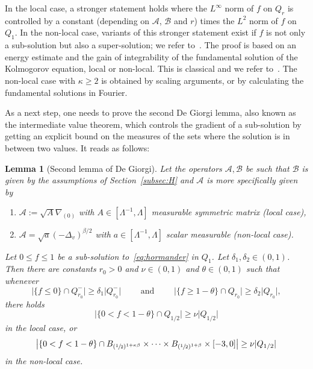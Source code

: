 \documentclass[10pt,a4paper]{amsart}
\newenvironment{enumeratei}
{\bgroup\def\theenumi{\roman{enumi}}\def\theenumii{\arabic{enumii}}\begin{enumerate}}
{\end{enumerate}\egroup}
\newtheorem{lemma}[theorem]{Lemma}
\theoremstyle{definition}
\newcommand{\cA}{{\mathcal A}}
\newcommand{\cB}{{\mathcal B}}
\begin{document}
In the local case, a stronger statement holds where the
$L^\infty$ norm of $f$ on $Q_r$ is controlled by a constant
(depending on $\cA$, $\cB$ and $r$) times the $L^2$ norm of $f$
on $Q_1$. In the non-local case, variants of this stronger
statement exist if $f$ is not only a sub-solution but also a
super-solution; we refer to~\cite{Loher-2023, Loher-2024}. The proof is based
on an energy estimate and the gain of integrability of the
fundamental solution of the Kolmogorov equation, local or
non-local. This is classical and we refer
to~\cite{guerand-mouhot,loher-2022-preprint-quantitative-de-giorgi,AR-harnack, PP, IS-weak, APP}. The
non-local case with $\kappa \geq 2$ is obtained
by scaling arguments, or by calculating the fundamental
solutions in Fourier.

As a next step, one needs to prove the second De Giorgi lemma, also known as the intermediate value theorem, which controls the gradient of a sub-solution by getting an explicit bound on the measures of the sets where the solution is in between two values.
It reads as follows:
\begin{lemma}[Second lemma of De Giorgi]
Let the operators $\cA, \cB$ be such that $\cB$ is given by
the assumptions of Section~\ref{subsec:H} and $\cA$ is more specifically given by
\begin{enumeratei}
\item
$\cA:=\sqrt{A} \nabla_{(0)}$ with
$A \in [\Lambda^{-1},\Lambda]$ measurable symmetric matrix (local
case),
\item
$\cA = \sqrt{a} (-\Delta_v)^{\beta/2}$ with
$a \in [\Lambda^{-1},\Lambda]$ scalar measurable (non-local
case).
\end{enumeratei}
Let $0 \leq f \leq 1$ be a sub-solution to~\eqref{eq:hormander} in $Q_1$. Let $\delta_1, \delta_2 \in (0, 1)$. Then there are
constants $r_0 > 0$ and $\nu \in (0, 1)$ and
$\theta \in (0, 1)$ such that whenever
\begin{equation*}
\label{eq:conditions-ivl}
\vert \{f \leq 0\} \cap Q_{r_0}^-\vert \geq \delta_1 \vert
Q_{r_0}^-\vert \qquad \textrm{ and } \qquad \vert \{f \geq
1-\theta\} \cap Q_{r_0}\vert \geq \delta_2 \vert Q_{r_0}\vert,
\end{equation*}
there holds
\begin{equation*}
\big\vert \{0 < f < 1-\theta\} \cap Q_{1/2}\big\vert \geq \nu
\vert Q_{1/2}\vert
\end{equation*}
in the local case, or
\begin{equation*}
\big\vert \{0 < f < 1-\theta\} \cap
B_{(\sfrac12)^{1+\kappa\beta}} \times \cdots \times
B_{(\sfrac12)^{1+\beta}} \times [-3,0] \big\vert \geq \nu
\vert Q_{1/2}\vert
\end{equation*}
in the non-local case.
\end{lemma}
\end{document}
